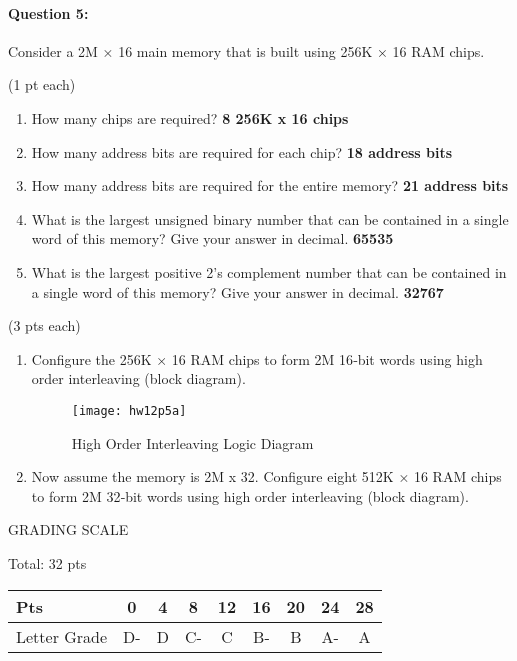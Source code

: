\documentclass[12pt,letterpaper,titlepage]{report}
\begin{document}
\begin{raggedright}
\clearpage

\paragraph{Question 5:}
Consider a 2M × 16 main memory that is built using 256K × 16 RAM chips.

(1 pt each)
\begin{enumerate} [label=\alph*)]
\item How many chips are required? \textbf{8 256K x 16 chips}
\item How many address bits are required for each chip? \textbf{18 address bits}
\item How many address bits are required for the entire memory? \textbf{21 address bits}
\item What is the largest unsigned binary number that can be contained in a single word of this memory? Give your answer in decimal. \textbf{65535}
\item What is the largest positive 2’s complement number that can be contained in a single word of this memory? Give your answer in decimal. \textbf{32767}
\end{enumerate}
(3 pts each)
\begin{enumerate} [label=\alph*), resume]
\item Configure the 256K × 16 RAM chips to form 2M 16‐bit words using high order interleaving (block diagram).
\begin{figure}[ht]
  \centering
  \texttt{[image: hw12p5a]}
  \caption{High Order Interleaving Logic Diagram}
\end{figure}

\pagebreak

\item Now assume the memory is 2M x 32. Configure eight 512K × 16 RAM chips to form 2M 32‐bit words using high order interleaving (block diagram).
\end{enumerate}


\vspace{\fill}
\noindent
GRADING SCALE
\medskip

Total: 32 pts
\bigskip

\def\arraystretch{1.5}
\begin{tabular}{ | l | c | c | c | c | c | c | c | c | } \hline
Pts          & 0  & 4  & 8  & 12 & 16 & 20 & 24 & 28     \\\hline
Letter Grade & D- & D  & C- & C  & B- & B  & A- & A      \\\hline
\end{tabular}
\end{raggedright}
\end{document}
